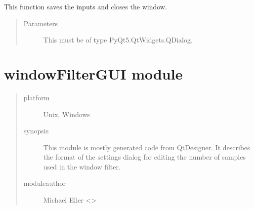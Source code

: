 \documentclass[letterpaper,10pt,english]{sphinxmanual}
\begin{document}
\begin{fulllineitems}
\begin{fulllineitems}
\end{fulllineitems}


\begin{fulllineitems}
\label{\detokenize{scaleAxesGUI:scaleAxesGUI.Ui_Dialog.save}}
This function saves the inputs and closes the window.
\begin{quote}\begin{description}
\item[{Parameters}] \leavevmode
{} \textendash{} This must be of type PyQt5.QtWidgets.QDialog.

\end{description}\end{quote}

\end{fulllineitems}


\end{fulllineitems}



\section{windowFilterGUI module}
\label{\detokenize{windowFilterGUI:module-windowFilterGUI}}\label{\detokenize{windowFilterGUI:windowfiltergui-module}}\label{\detokenize{windowFilterGUI::doc}}\begin{quote}\begin{description}
\item[{platform}] \leavevmode
Unix, Windows

\item[{synopsis}] \leavevmode
This module is mostly generated code from QtDesigner. It describes the format of the settings
dialog for editing the number of samples used in the window filter.

\item[{moduleauthor}] \leavevmode
Michael Eller \textless{}\textgreater{}

\end{description}\end{quote}
\end{document}
